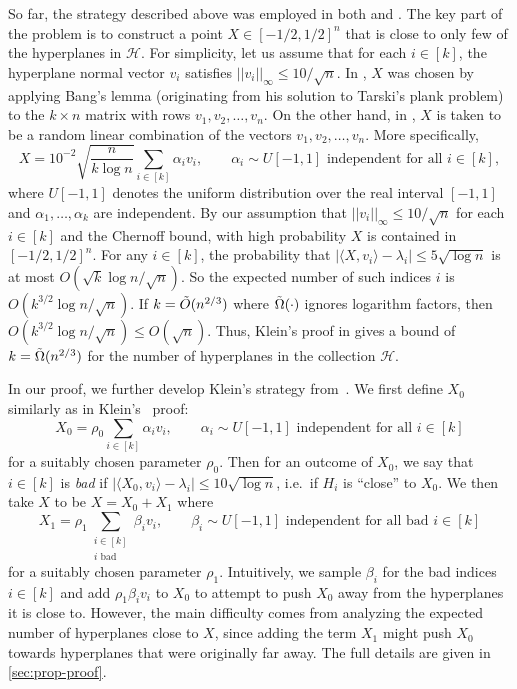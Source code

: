\documentclass[reqno]{amsart}
\theoremstyle{remark}
\theoremstyle{definition}
\numberwithin{theorem}{section}
\renewcommand{\(}{\bigl(}
\renewcommand{\)}{\bigr)\vphantom{)}}
\newcommand{\cH}{\mathcal H}
\renewcommand{\le}{\leqslant}
\newcommand{\ang}[1]{\langle#1\rangle}
\begin{document}
So far, the strategy described above was employed in both \cite{yehuda2021slicing} and \cite{klein2022slicing}. The key part of the problem is to construct a point $X\in [-1/2,1/2]^n$ that is close to only few of the hyperplanes in $\cH$. For simplicity, let us assume that for each $i\in [k]$, the hyperplane normal vector $v_i$ satisfies $||v_i||_\infty \le 10/\sqrt{n}$. In \cite{yehuda2021slicing}, $X$ was chosen by applying Bang's lemma (originating from his solution \cite{bang1951} to Tarski’s plank problem) to the $k\times n$ matrix with rows $v_1,v_2,\dots,v_n$. On the other hand, in \cite{klein2022slicing}, $X$ is taken to be a random linear combination of the vectors $v_1,v_2,\dots,v_n$. More specifically, 
\[X = 10^{-2}\sqrt{\frac{n}{k\log n}}\sum_{i\in [k]}\alpha_iv_i, \quad\quad  \alpha_i\sim U[-1,1]\text{ independent for all } i\in [k],\]
where $U[-1,1]$ denotes the uniform distribution over the real interval $[-1,1]$ and $\alpha_1,\dots, \alpha_k$ are independent. By our assumption that $||v_i||_\infty \le 10/\sqrt{n}$ for each $i\in [k]$ and the Chernoff bound, with high probability $X$ is contained in $[-1/2,1/2]^n$. For any $i\in [k]$, the probability that $|\ang{X,v_i} - \lambda_i|\le 5\sqrt{\log n}$ is at most $O(\sqrt{k}\log n/\sqrt{n})$. So the expected number of such indices $i$ is $O(k^{3/2}\log n/\sqrt{n})$. If $k = \Tilde{O}(n^{2/3})$ where $\Tilde{\Omega}(\cdot)$ ignores logarithm factors, then $O(k^{3/2}\log n/\sqrt{n}) \le  O(\sqrt{n})$. Thus, Klein's proof in \cite{klein2022slicing} gives a bound of $k = \Tilde{\Omega}(n^{2/3})$ for the number of hyperplanes in the collection $\cH$.

In our proof, we further develop Klein's strategy from~\cite{klein2022slicing}. We first define $X_0$ similarly as in Klein's~\cite{klein2022slicing} proof:
\[X_0 = \rho_0\sum_{i\in [k]}\alpha_iv_i, \quad\quad  \alpha_i\sim U[-1,1] \text{ independent for all } i\in [k]\]
for a suitably chosen parameter $\rho_0$. Then for an outcome of $X_0$, we say that $i\in [k]$ is \emph{bad} if $|\ang{X_0, v_i} - \lambda_i| \le 10\sqrt{\log n}$, i.e.\ if $H_i$ is ``close'' to $X_0$. We then take $X$ to be $X = X_0+X_1$ where 
\[X_1 = \rho_1 \sum_{\substack{i\in [k]\\i\text{ bad}}}\beta_i v_i,\quad\quad \beta_i\sim U[-1,1]\text{ independent for all bad }i\in [k]\]
for a suitably chosen parameter $\rho_1$. Intuitively, we sample $\beta_i$ for the bad indices $i\in [k]$ and add $\rho_1\beta_i v_i$ to $X_0$ to attempt to push $X_0$ away from the hyperplanes it is close to. However, the main difficulty comes from analyzing the expected number of hyperplanes close to $X$, since adding the term $X_1$ might push $X_0$ towards hyperplanes that were originally far away. The full details are given in \cref{sec:prop-proof}.
\end{document}
